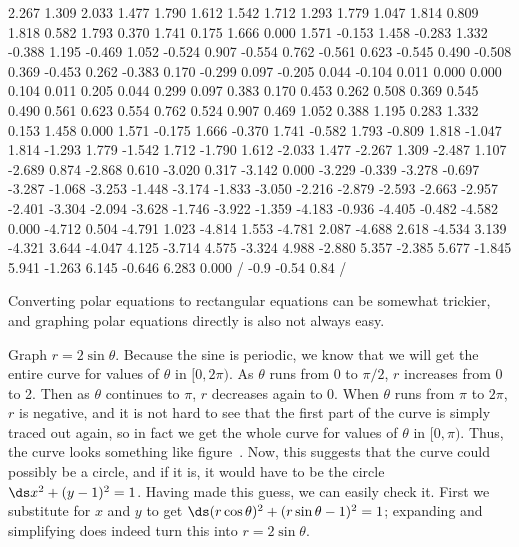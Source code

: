 {2.267 1.309 2.033 1.477 1.790 1.612 1.542 1.712 1.293 1.779
1.047 1.814 0.809 1.818 0.582 1.793 0.370 1.741 0.175 1.666
0.000 1.571 -0.153 1.458 -0.283 1.332 -0.388 1.195 -0.469 1.052
-0.524 0.907 -0.554 0.762 -0.561 0.623 -0.545 0.490 -0.508 0.369
-0.453 0.262 -0.383 0.170 -0.299 0.097 -0.205 0.044 -0.104 0.011
0.000 0.000 0.104 0.011 0.205 0.044 0.299 0.097 0.383 0.170
0.453 0.262 0.508 0.369 0.545 0.490 0.561 0.623 0.554 0.762
0.524 0.907 0.469 1.052 0.388 1.195 0.283 1.332 0.153 1.458
0.000 1.571 -0.175 1.666 -0.370 1.741 -0.582 1.793 -0.809 1.818
-1.047 1.814 -1.293 1.779 -1.542 1.712 -1.790 1.612 -2.033 1.477
-2.267 1.309 -2.487 1.107 -2.689 0.874 -2.868 0.610 -3.020 0.317
-3.142 0.000 -3.229 -0.339 -3.278 -0.697 -3.287 -1.068 -3.253 -1.448
-3.174 -1.833 -3.050 -2.216 -2.879 -2.593 -2.663 -2.957 -2.401 -3.304
-2.094 -3.628 -1.746 -3.922 -1.359 -4.183 -0.936 -4.405 -0.482 -4.582
0.000 -4.712 0.504 -4.791 1.023 -4.814 1.553 -4.781 2.087 -4.688
2.618 -4.534 3.139 -4.321 3.644 -4.047 4.125 -3.714 4.575 -3.324
4.988 -2.880 5.357 -2.385 5.677 -1.845 5.941 -1.263 6.145 -0.646
6.283 0.000 /
\setdashes <2pt>
\setlinear
{} -0.9 -0.54 0.84 /
\endpicture}

Converting polar equations to rectangular equations can be somewhat
trickier, and graphing polar equations directly is also not always easy.

\begin{example} Graph $r=2\sin\theta$. Because the sine is periodic, we know
that we will get the entire curve for values of $\theta$ in
$[0,2\pi)$. As $\theta$ runs from 0 to $\pi/2$, $r$ increases from 0
to 2. Then as $\theta$ continues to $\pi$, $r$ decreases again to
0. When $\theta$ runs from $\pi$ to $2\pi$, $r$ is negative, and it
is not hard to see that the first part of the curve is simply traced
out again, so in fact we get the whole curve for values of $\theta$
in $[0,\pi)$. Thus, the curve looks something like
figure~. Now, this suggests
that the curve could possibly be a circle, and if it is, it would
have to be the circle $\ds x^2+(y-1)^2=1$. Having made this guess, we
can easily check it. First we substitute for $x$ and $y$ to get
$\ds (r\cos\theta)^2+(r\sin\theta-1)^2=1$; expanding and simplifying
does indeed turn this into $r=2\sin\theta$.
\end{example}

